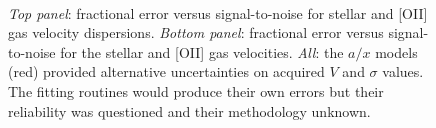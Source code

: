 \documentclass[12pt, twocolumn]{revtex4-1}    %
\begin{document}
\begin{figure}
\centering
{}
\\
\captionsetup{justification=raggedright}
\caption[HUDF Objects]{\textit{Top panel}: fractional error versus signal-to-noise for stellar and [OII] gas velocity dispersions. \textit{Bottom panel}: fractional error versus signal-to-noise for the stellar and [OII] gas velocities. \textit{All}: the $a/x$ models (red) provided alternative uncertainties on acquired $V$ and $\sigma$ values. The fitting routines would produce their own errors but their reliability was questioned and their methodology unknown.}
  \label{fig:fractional_errors}
\end{figure}
\end{document}
